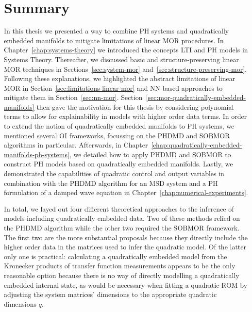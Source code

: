 \chapter{Summary}\label{chap:summary}

In this thesis we presented a way to combine \ac{PH} systems and quadratically embedded manifolds to mitigate limitations of linear \ac{MOR} procedures.
In Chapter~\ref{chap:systems-theory} we introduced the concepts \ac{LTI} and \ac{PH} models in Systems Theory.
Thereafter, we discussed basic and structure-preserving linear \ac{MOR} techniques in Sections~\ref{sec:system-mor} and~\ref{sec:structure-preserving-mor}.
Following these explanations, we highlighted the abstract limitations of linear \ac{MOR} in Section~\ref{sec:limitations-linear-mor} and \ac{NN}-based approaches to mitigate them in Section~\ref{sec:nn-mor}.
Section~\ref{sec:mor-quadratically-embedded-manifolds} then gave the motivation for this thesis by considering polynomial terms to allow for explainability in models with higher order data terms.
In order to extend the notion of quadratically embedded manifolds to \ac{PH} systems, we mentioned several \ac{OI} frameworks, focussing on the \ac{PHDMD} and \ac{SOBMOR} algorithms in particular.
Afterwards, in Chapter~\ref{chap:quadratically-embedded-manifolds-ph-systems}, we detailed how to apply \ac{PHDMD} and \ac{SOBMOR} to construct \ac{PH} models based on quadratically embedded manifolds.
Lastly, we demonstrated the capabilities of quadratic control and output variables in combination with the \ac{PHDMD} algorithm for an \ac{MSD} system and a \ac{PH} formulation of a damped wave equation in Chapter~\ref{chap:numerical-experiments}.

In total, we layed out four different theoretical approaches to the inference of models including quadratically embedded data.
Two of these methods relied on the \ac{PHDMD} algorithm while the other two required the \ac{SOBMOR} framework.
The first two are the more substantial proposals because they directly include the higher order data in the matrices used to infer the quadratic model.
Of the latter only one is practical: calculating a quadratically embedded model from the Kronecker products of transfer function measurements appears to be the only reasonable option because there is no way of directly modelling a quadratically embedded internal state, as would be necessary when fitting a quadratic \ac{ROM} by adjusting the system matrices' dimensions to the appropriate quadratic dimensions $q$.

